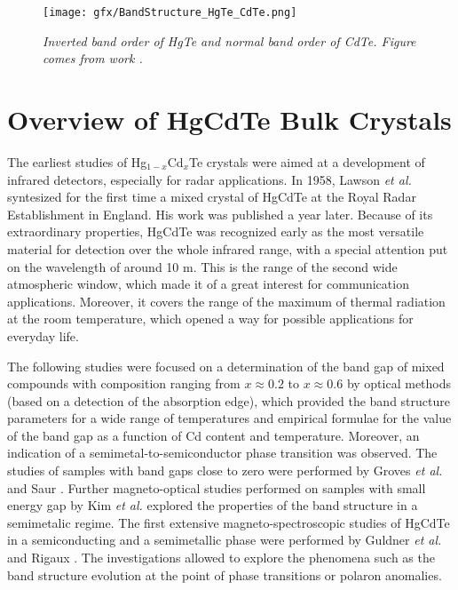 \documentclass[titlepage,a4paper]{book}
\newcommand{\wciecie}{\quad\phantom{v}}
\begin{document}
\begin{figure}[H]
	\centering
	\texttt{[image: gfx/BandStructure\_HgTe\_CdTe.png]}
	\vspace{-10pt}
	\caption{\textit{Inverted band order of HgTe and normal band order of CdTe. Figure comes from work \cite{Bernevig_Topology2}.}}
	\label{fig:BandStructure_HgTe_CdTe}
\end{figure} 

\section{Overview of HgCdTe Bulk Crystals}
\wciecie
The earliest studies of Hg$_{1-x}$Cd$_x$Te crystals were aimed at a development of infrared detectors, especially for radar applications. In 1958, Lawson \textit{et al.} syntesized for the first time a mixed crystal of HgCdTe at the Royal Radar Establishment in England. His work was published \cite{Lawson_MCT} a year later. Because of its extraordinary properties, HgCdTe was recognized early as the most versatile material for detection over the whole infrared range, with a special attention put on the wavelength of around 10 \textmu m. This is the range of the second wide atmospheric window, which made it of a great interest for communication applications. Moreover, it covers the range of the maximum of thermal radiation at the room temperature, which opened a way for possible applications for everyday life. 

The following studies were focused on a determination of the band gap of mixed compounds with composition ranging from $x \approx 0.2$ to $x \approx 0.6$ by optical methods \cite{Schmit_MCT_bulk}\cite{Scott_MCT_bulk} (based on a detection of the absorption edge), which provided the band structure parameters for a wide range of temperatures and empirical formulae for the value of the band gap as a function of Cd content and temperature. Moreover, an indication of a semimetal-to-semiconductor phase transition was observed. The studies of samples with band gaps close to zero were performed by Groves \textit{et al.} \cite{Groves_MCT_bulk} and Saur \cite{Saur_MCT_bulk}. Further magneto-optical studies performed on samples with small energy gap by Kim \textit{et al.} \cite{Kim_MCT_bulk} explored the properties of the band structure in a semimetalic regime. The first extensive magneto-spectroscopic studies of HgCdTe in a semiconducting \cite{Guldner_MCT_bulk1} and a semimetallic \cite{Guldner_MCT_bulk2} phase were performed by Guldner \textit{et al.} and Rigaux \cite{Rigaux_MCT_bulk}. The investigations allowed to explore the phenomena such as the band structure evolution at the point of phase transitions or polaron anomalies.
\end{document}
